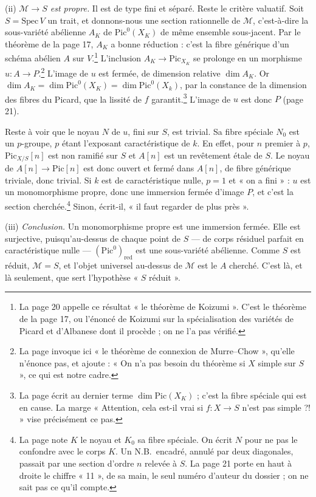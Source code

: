\documentclass[11pt,a4paper]{article}
\begin{document}
(ii) \emph{$\mathcal{M} \to S$ est propre.} Il est de type fini et séparé. Reste
le critère valuatif. Soit $S = \mathrm{Spec}\, V$ un trait, et donnons-nous
une section rationnelle de $\mathcal{M}$, c'est-à-dire la sous-variété
abélienne $A_K$ de $\mathrm{Pic}^{0}(X_K)$ de même ensemble sous-jacent. Par le
théorème de la page 17, $A_K$ a bonne réduction : c'est la fibre générique
d'un schéma abélien $A$ sur $V$.\footnote{La page 20 appelle ce résultat
« le théorème de Koizumi ». C'est le théorème de la page 17, ou l'énoncé de
Koizumi sur la spécialisation des variétés de Picard et d'Albanese dont il
procède ; on ne l'a pas vérifié.} L'inclusion $A_K \to \mathrm{Pic}_{X_K}$ se
prolonge en un morphisme $u \colon A \to P$.\footnote{La page invoque ici « le
théorème de connexion de Murre--Chow », qu'elle n'énonce pas, et ajoute : « On
n'a pas besoin du théorème si $X$ simple sur $S$ », ce qui est notre cadre.}
L'image de $u$ est fermée, de dimension relative $\dim A_K$. Or
$\dim A_K = \dim \mathrm{Pic}^{0}(X_K) = \dim \mathrm{Pic}^{0}(X_k)$, par la
constance de la dimension des fibres du Picard, que la lissité de $f$
garantit.\footnote{La page écrit au dernier terme $\dim \mathrm{Pic}(X_K)$ ;
c'est la fibre spéciale qui est en cause. La marge « Attention, cela est-il vrai
si $f \colon X \to S$ n'est pas simple ?! » vise précisément ce pas.} L'image
de $u$ est donc $P$ (page 21).

Reste à voir que le noyau $N$ de $u$, fini sur $S$, est trivial. Sa fibre
spéciale $N_0$ est un $p$-groupe, $p$ étant l'exposant caractéristique de
$k$. En effet, pour $n$ premier à $p$, $\mathrm{Pic}_{X/S}[n]$ est non ramifié
sur $S$ et $A[n]$ est un revêtement étale de $S$. Le noyau de
$A[n] \to \mathrm{Pic}[n]$ est donc ouvert et fermé dans $A[n]$, de fibre
générique triviale, donc trivial. Si $k$ est de caractéristique nulle, $p = 1$
et « on a fini » : $u$ est un monomorphisme propre, donc une immersion fermée
d'image $P$, et c'est la section cherchée.\footnote{La page note $K$ le noyau
et $K_0$ sa fibre spéciale. On écrit $N$ pour ne pas le confondre avec le corps
$K$. Un N.B.\ encadré, annulé par deux diagonales, passait par une section
d'ordre $n$ relevée à $S$. La page 21 porte en haut à droite le chiffre
« 11 », de sa main, le seul numéro d'auteur du dossier ; on ne sait pas ce
qu'il compte.} Sinon, écrit-il, « il faut regarder de plus près ».

(iii) \emph{Conclusion.} Un monomorphisme propre est une immersion fermée. Elle
est surjective, puisqu'au-dessus de chaque point de $S$ --- de corps résiduel
parfait en caractéristique nulle --- $(\mathrm{Pic}^{0})_{\mathrm{red}}$ est une
sous-variété abélienne. Comme $S$ est réduit, $\mathcal{M} = S$, et l'objet
universel au-dessus de $\mathcal{M}$ est le $A$ cherché. C'est là, et là
seulement, que sert l'hypothèse « $S$ réduit ».
\end{document}
